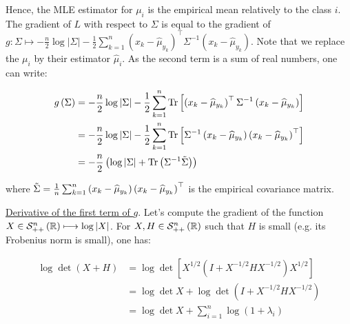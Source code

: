 \documentclass[a4paper, 11pt]{article}
\begin{document}
\begin{enumerate}[label=\alph*]
    Hence, the MLE estimator for $\mu_{i}$ is the empirical mean relatively to the class $i$. The gradient of $L$ with respect to $\Sigma$ is equal to the gradient of $g: \Sigma \mapsto - \frac{n}{2} \log \left| \Sigma \right| - \frac{1}{2} \sum_{k=1}^{n} \left( x_{k} - \widehat{\mu}_{y_{k}} \right)^\top \Sigma^{-1} \left( x_{k} - \widehat{\mu}_{y_{k}} \right)$. Note that we replace the $\mu_{i}$ by their estimator $\widehat{\mu}_{i}$. As the second term is a sum of real numbers, one can write:
    
    \begin{equation*}
        \begin{aligned}
        g \left( \Sigma \right) &= - \frac{n}{2} \log \left| \Sigma \right| - \frac{1}{2} \sum_{k=1}^{n} \operatorname{Tr} \left[ \left( x_{k} - \widehat{\mu}_{y_{k}} \right)^\top \Sigma^{-1} \left( x_{k} - \widehat{\mu}_{y_{k}} \right) \right] \\
        &= - \frac{n}{2} \log \left| \Sigma \right| - \frac{1}{2} \sum_{k=1}^{n} \operatorname{Tr} \left[ \Sigma^{-1} \left( x_{k} - \widehat{\mu}_{y_{k}} \right) \left( x_{k} - \widehat{\mu}_{y_{k}} \right)^\top \right] \\
        &= - \frac{n}{2} \left( \log \left| \Sigma \right| + \operatorname{Tr} \left( \Sigma^{-1} \Tilde{\Sigma} \right) \right)
        \end{aligned}
    \end{equation*}
    
    where $\Tilde{\Sigma} = \frac{1}{n} \sum_{k=1}^{n} \left( x_{k} - \widehat{\mu}_{y_{k}} \right) \left( x_{k} - \widehat{\mu}_{y_{k}} \right)^\top$ is the empirical covariance matrix. 
    
    \underline{Derivative of the first term of $g$}. Let's compute the gradient of the function $X \in \mathcal{S}_{++}^{n} \left( \mathbb{R} \right) \longmapsto \log \left| X \right|$. For $X, H \in \mathcal{S}_{++}^{n} \left( \mathbb{R} \right)$ such that $H$ is small (e.g. its Frobenius norm is small), one has:
    
    \begin{equation*}
        \begin{aligned}
        \log \det \left( X + H \right) &= \log \det \left[ X^{1/2} \left( I + X^{-1/2}HX^{-1/2} \right) X^{1/2} \right] \\
        &= \log \det X + \log \det \left( I + X^{-1/2}HX^{-1/2} \right) \\
        &= \log \det X + \sum_{i=1}^{n} \log \left( 1 + \lambda_{i} \right)
        \end{aligned}
    \end{equation*}
    \vspace*{.6em}
    

\end{enumerate}
\end{document}
